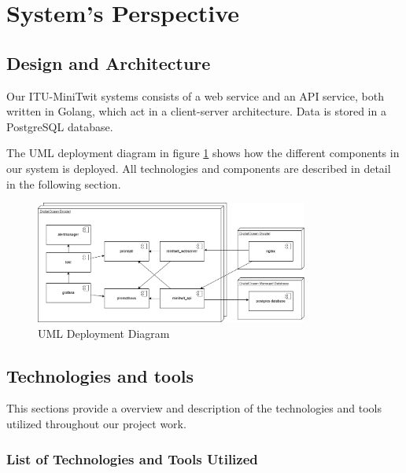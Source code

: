 \section{System's Perspective}


\subsection{Design and Architecture}

Our ITU-MiniTwit systems consists of a web service and an API service, both written in Golang, which act in a client-server architecture. Data is stored in a PostgreSQL database. 


The UML deployment diagram in figure \ref{fig:deployment} shows how the different components in our system is deployed. All technologies and components are described in detail in the following section.

\begin{figure}[H]
    \centering
    \includegraphics[width=0.8\textwidth]{images/deployment.png}
    \caption{UML Deployment Diagram}
    \label{fig:deployment}
\end{figure}


\subsection{Technologies and tools}
This sections provide a overview and description of the technologies and tools utilized throughout our project work.


\subsubsection*{List of Technologies and Tools Utilized}

